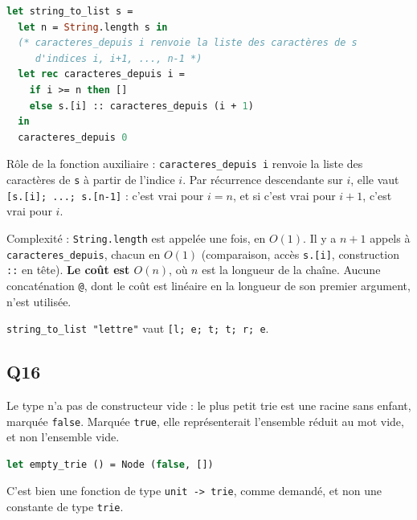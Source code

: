 \documentclass[11pt,a4paper]{article}
\begin{document}
\begin{lstlisting}[language=Caml]
let string_to_list s =
  let n = String.length s in
  (* caracteres_depuis i renvoie la liste des caractères de s
     d'indices i, i+1, ..., n-1 *)
  let rec caracteres_depuis i =
    if i >= n then []
    else s.[i] :: caracteres_depuis (i + 1)
  in
  caracteres_depuis 0
\end{lstlisting}

Rôle de la fonction auxiliaire : \texttt{caracteres\_depuis\ i} renvoie la liste des caractères de \texttt{s} à partir de l'indice \(i\). Par récurrence descendante sur \(i\), elle vaut \texttt{{[}s.{[}i{]}\allowbreak{};\allowbreak{}\ ...;\allowbreak{}\ s.{[}n-1{]}\allowbreak{}{]}\allowbreak{}} : c'est vrai pour \(i = n\), et si c'est vrai pour \(i+1\), c'est vrai pour \(i\).

Complexité : \texttt{String.length} est appelée une fois, en \(O(1)\). Il y a \(n + 1\) appels à \texttt{caracteres\_depuis}, chacun en \(O(1)\) (comparaison, accès \texttt{s.{[}i{]}}, construction \texttt{::} en tête). \textbf{Le coût est \(O(n)\)}, où \(n\) est la longueur de la chaîne. Aucune concaténation \texttt{@}, dont le coût est linéaire en la longueur de son premier argument, n'est utilisée.

\texttt{string\_to\_list\ "lettre"} vaut \texttt{{[}\textquotesingle{}l\textquotesingle{};\allowbreak{}\ \textquotesingle{}e\textquotesingle{};\allowbreak{}\ \textquotesingle{}t\textquotesingle{};\allowbreak{}\ \textquotesingle{}t\textquotesingle{};\allowbreak{}\ \textquotesingle{}r\textquotesingle{};\allowbreak{}\ \textquotesingle{}e\textquotesingle{}{]}\allowbreak{}}.

\hypertarget{q16}{%
\subsection{Q16}\label{q16}}

Le type n'a pas de constructeur vide : le plus petit trie est une racine sans enfant, marquée \texttt{false}. Marquée \texttt{true}, elle représenterait l'ensemble réduit au mot vide, et non l'ensemble vide.

\begin{lstlisting}[language=Caml]
let empty_trie () = Node (false, [])
\end{lstlisting}

C'est bien une fonction de type \texttt{unit\ -\textgreater{}\ trie}, comme demandé, et non une constante de type \texttt{trie}.
\end{document}
